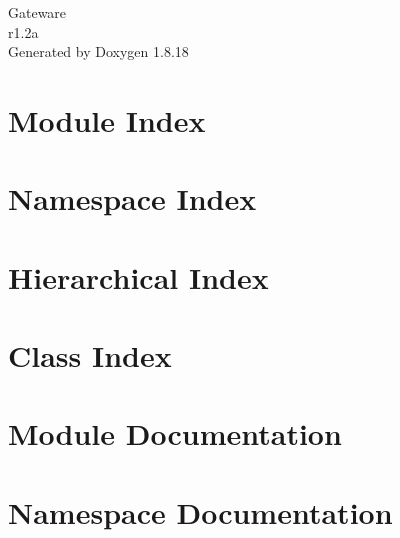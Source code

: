 \let\mypdfximage\pdfximage\def\pdfximage{\immediate\mypdfximage}\documentclass[twoside]{book}
\newcommand{\+}{\discretionary{\mbox{\scriptsize$\hookleftarrow$}}{}{}}
\newcommand{\clearemptydoublepage}{%
  \newpage{\pagestyle{empty}\cleardoublepage}%
}
\begin{document}
\hypersetup{pageanchor=false,
             bookmarksnumbered=true,
             pdfencoding=unicode
            }
\begin{titlepage}
\vspace*{7cm}
\begin{center}%
{\Large Gateware \\[1ex]\large r1.\+2a }\\
\vspace*{1cm}
{\large Generated by Doxygen 1.8.18}\\
\end{center}
\end{titlepage}
\clearemptydoublepage
{}
\tableofcontents
\clearemptydoublepage
{}
\hypersetup{pageanchor=true}

\chapter{Module Index}

\chapter{Namespace Index}

\chapter{Hierarchical Index}

\chapter{Class Index}

\chapter{Module Documentation}


\chapter{Namespace Documentation}







\end{document}
